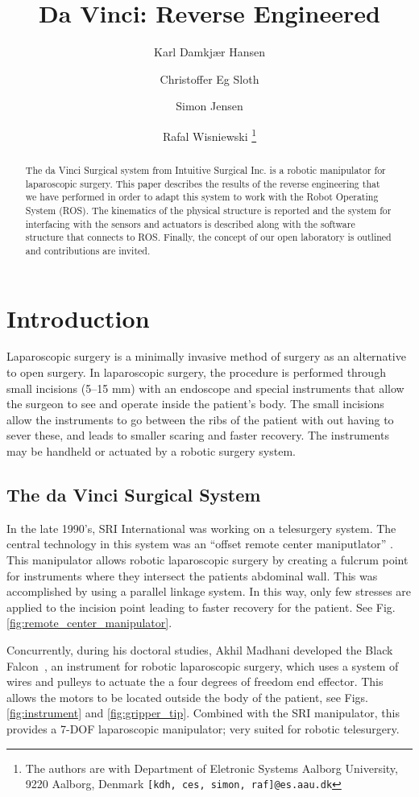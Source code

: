 \documentclass[a4paper, 10 pt, conference]{ieeeconf}      %
\title{\LARGE \bf
Da Vinci: Reverse Engineered
}
\author{Karl Damkjær Hansen \and Christoffer Eg Sloth \and Simon Jensen \and Rafal Wisniewski%
\thanks{The authors are with Department of Eletronic Systems
        Aalborg University, 9220 Aalborg, Denmark
        {\tt\small [kdh, ces, simon, raf]@es.aau.dk}}%
}
\begin{document}
\maketitle
\thispagestyle{empty}
\pagestyle{empty}


\begin{abstract}

The da Vinci Surgical system from Intuitive Surgical Inc. is a robotic manipulator for laparoscopic surgery. This paper describes the results of the reverse engineering that we have performed in order to adapt this system to work with the Robot Operating System (ROS). The kinematics of the physical structure is reported and the system for interfacing with the sensors and actuators is described along with the software structure that connects to ROS. Finally, the concept of our open laboratory is outlined and contributions are invited.

\end{abstract}


\section{Introduction}
Laparoscopic surgery is a minimally invasive method of surgery as an alternative to open surgery.
In laparoscopic surgery, the procedure is performed through small incisions (5--15 mm) with an endoscope and special instruments that allow the surgeon to see and operate inside the patient's body.
The small incisions allow the instruments to go between the ribs of the patient with out having to sever these, and leads to smaller scaring and faster recovery.
The instruments may be handheld or actuated by a robotic surgery system.

\subsection{The da Vinci Surgical System}
In the late 1990's, SRI International was working on a telesurgery system.
The central technology in this system was an ``offset remote center maniputlator'' \cite{jensen1998remote}.
This manipulator allows robotic laparoscopic surgery by creating a fulcrum point for instruments where they intersect the patients abdominal wall.
This was accomplished by using a parallel linkage system.
In this way, only few stresses are applied to the incision point leading to faster recovery for the patient.
See Fig. \ref{fig:remote_center_manipulator}.

Concurrently, during his doctoral studies, Akhil Madhani developed the Black Falcon~\cite{blackFalcon, madhani1997design, madhani1998articulated}, an instrument for robotic laparoscopic surgery, which uses a system of wires and pulleys to actuate the a four degrees of freedom end effector.
This allows the motors to be located outside the body of the patient, see Figs. \ref{fig:instrument} and \ref{fig:gripper_tip}.
Combined with the SRI manipulator, this provides a 7-DOF laparoscopic manipulator; very suited for robotic telesurgery.
\end{document}
